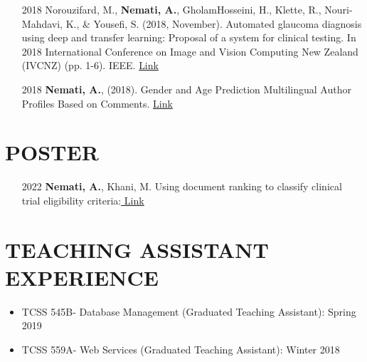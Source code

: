\documentclass[letterpaper,11pt]{article}
\newcommand{\resumeSubHeadingListStart}{\begin{itemize}[leftmargin=*]}
\newcommand{\resumeSubHeadingListEnd}{\end{itemize}}
\begin{document}
\begin{enumerate}
    
    \item[2018] Norouzifard, M., \textbf{Nemati, A.}, GholamHosseini, H., Klette, R., Nouri-Mahdavi, K., \& Yousefi, S. (2018, November). Automated glaucoma diagnosis using deep and transfer learning: Proposal of a system for clinical testing. In 2018 International Conference on Image and Vision Computing New Zealand (IVCNZ) (pp. 1-6). IEEE.    \hspace*{0pt}\hfill {\color{blue}\href{http://dx.doi.org/10.1109/IVCNZ.2018.8634671}{ Link}}
    
   \item[2018] \textbf{Nemati, A.}, (2018). Gender and Age Prediction Multilingual Author Profiles Based on Comments. \hspace*{0pt}\hfill {\color{blue}\href{http://ceur-ws.org/Vol-2266/T4-4.pdf}{ Link}}
\end{enumerate}

\section{\textbf{POSTER}}
\begin{enumerate}
    \item[2022]  \textbf{Nemati, A.}, Khani, M.  Using document ranking to classify clinical trial eligibility criteria:\hspace*{0pt}\hfill {\color{blue}\href{https://drive.google.com/file/d/1_Gd3co8i-Me-anvFjnzNBqSyFvdQgESc/view?usp=sharing}{ Link}}
       

\end{enumerate}

\section{\textbf{TEACHING ASSISTANT EXPERIENCE}}
\resumeSubHeadingListStart

       
             \item {TCSS 545B- Database Management (Graduated Teaching Assistant): }\hspace*{0pt}\hfill{Spring 2019}
       
             \item {TCSS 559A- Web Services (Graduated Teaching Assistant):} \hspace*{0pt}\hfill{  Winter 2018}
             
      \resumeSubHeadingListEnd
\end{document}
